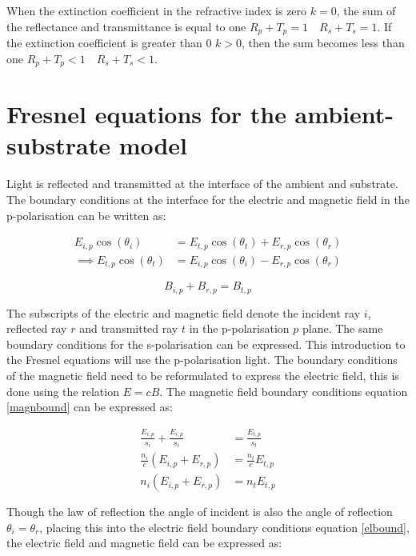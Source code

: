 \documentclass[MasterThesisMain.tex]{subfiles}
\begin{document}
When the extinction coefficient in the refractive index is zero $k=0$, the sum of the reflectance and transmittance is equal to one $R_p + T_p = 1 \quad R_s + T_s = 1 $. If the extinction coefficient is greater than 0 $k>0$, then the sum becomes less than one $R_p + T_p < 1 \quad R_s + T_s < 1 $.	
\section{Fresnel equations for the ambient-substrate model}
Light is reflected and transmitted at the interface of the ambient and substrate. The boundary conditions at the interface for the electric and magnetic field in the p-polarisation can be written as:

\begin{align} \label{elbound}
E_{i,p}\cos{(\theta_i)} &= E_{t,p}\cos{(\theta_t)} + E_{r,p}\cos{(\theta_r)}\\
\implies E_{t,p}\cos{(\theta_t)} &= E_{i,p}\cos{(\theta_i)} - E_{r,p}\cos{(\theta_r)}
\end{align} 

\begin{equation} \label{magnbound}
B_{i,p} + B_{r,p} = B_{t,p}
\end{equation}

The subscripts of the electric and magnetic field denote the incident ray $i$, reflected ray $r$ and transmitted ray $t$ in the p-polarisation $p$ plane. The same boundary conditions for the s-polarisation can be expressed. This introduction to the Fresnel equations will use the p-polarisation light. The boundary conditions of the magnetic field need to be reformulated to express the electric field, this is done using the relation $E=cB$. The magnetic field boundary conditions equation \ref{magnbound} can be expressed as:

\begin{align}
\frac{E_{i,p}}{s_i} + \frac{E_{i,p}}{s_i} &= \frac{E_{t,p}}{s_t}\\
\frac{n_i}{c}(E_{i,p}+E_{r,p}) &= \frac{n_t}{c}E_{t,p}\\
n_i(E_{i,p}+E_{r,p}) &= n_tE_{t,p}
\end{align} 

Though the law of reflection the angle of incident is also the angle of reflection $\theta_i=\theta_r$, placing this into the electric field boundary conditions equation \ref{elbound}, the electric field and magnetic field can be expressed as:
\end{document}
